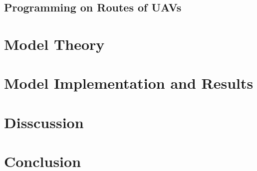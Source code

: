 \documentclass{mcmthesis}
\begin{document}
\subsection{Programming on Routes of UAVs}

\section{Model Theory}

\section{Model Implementation and Results}


\section{Disscussion}

\section{Conclusion}
\section{}
\end{document}
